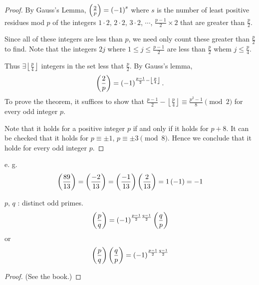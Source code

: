 \begin{proof}
    By Gauss's Lemma, $\left(\frac{2}{p}\right)=\left(-1\right)^s$
    where $s$ is the number of least positive residues mod $p$ of the integers $1\cdot 2$,
    $2 \cdot 2$, $3 \cdot 2$, $\cdots$, $\frac{p-1}{2}\times 2$ that are greater than $\frac{p}{2}$.  
    
    Since all of these integers are less than $p$, we need only count these greater than $\frac{p}{2}$ to find.
    Note that the integers $2j$ where $1\leq j\leq \frac{p-1}{2}$ are less than $\frac{p}{2}$ whem
    $j \leq \frac{p}{4}$.

    Thus $\exists \left\lfloor\frac{p}{4}\right\rfloor$ integers in the set less
    that $\frac{p}{2}$. By Gauss's lemma,
    \[
        \left(\frac{2}{p}\right) = \left(-1\right)^{\frac{p-1}{2} - \left\lfloor\frac{p}{4}\right\rfloor}.
    \]
    To prove the theorem, it suffices to show that $\frac{p-1}{2} - \left\lfloor\frac{p}{4}\right\rfloor \equiv \frac{p^2-1}{8} \pmod{2}$
    for every odd integer $p$.

    Note that it holds for a positive integer $p$ if and only if it holds for $p+8$.
    It can be checked that it holds for $p\equiv\pm 1$, $p\equiv\pm 3 \pmod{8}$.
    Hence we conclude that it holde for every odd integer $p$.
\end{proof}

e. g. 
\[
    \left(\frac{89}{13}\right)=\left(\frac{-2}{13}\right)=\left(\frac{-1}{13}\right)\left(\frac{2}{13}\right)
    = 1\left(-1\right) =-1
\]

\begin{theorem}
    $p,\,q$ : distinct odd primes.
    \[
        \left(\frac{p}{q}\right)=\left(-1\right)^{\frac{p-1}{2}\frac{q-1}{2}}\left(\frac{q}{p}\right)
    \]
    or
    \[
        \left(\frac{p}{q}\right)\left(\frac{q}{p}\right) = \left(-1\right)^{\frac{p-1}{2}\frac{q-1}{2}}
    \]
\end{theorem}

\begin{proof}
    (See the book.)
\end{proof}

